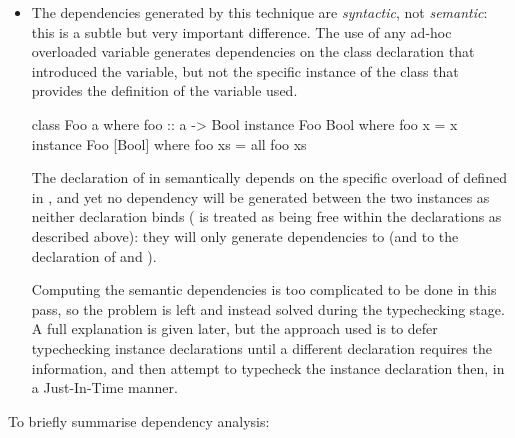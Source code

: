 \documentclass[dissertation.tex]{subfiles}
\begin{document}
{{\begin{itemize}
{            However, we treat binding declarations inside  declarations as actually being free uses
            rather than binding uses, so that the instance declaration forms a dependence on the class declaration where
            the variables are bound, ensuring it is typechecked first.

        }
        \item\label{sec:dependencies-syntactic-semantic}
        {

            The dependencies generated by this technique are \textit{syntactic}, not \textit{semantic}: this is a subtle
            but very important difference. The use of any ad-hoc overloaded variable generates dependencies on the class
            declaration that introduced the variable, but not the specific instance of the class that provides the
            definition of the variable used.

            \begin{haskellfigure}
            class Foo a where
                foo :: a -> Bool
            instance Foo Bool where
                foo x = x
            instance Foo [Bool] where
                foo xs = all foo xs
            \end{haskellfigure}

            The declaration of  in  semantically depends on the specific
            overload of  defined in , and yet no dependency will be generated
            between the two instances as neither declaration binds  ( is treated as being free
            within the declarations as described above): they will only generate dependencies to 
            (and to the declaration of  and ).

            Computing the semantic dependencies is too complicated to be done in this pass, so the problem is left and
            instead solved during the typechecking stage. A full explanation is given later, but the approach used is to
            defer typechecking instance declarations until a different declaration requires the information, and then
            attempt to typecheck the instance declaration then, in a Just-In-Time manner.

        }
        \end{itemize}

        To briefly summarise dependency analysis:

}}
\end{document}
